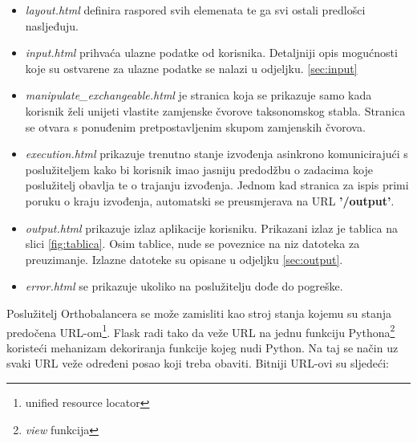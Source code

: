 \begin{itemize}

    \item \emph{layout.html} definira raspored svih elemenata te ga svi ostali
predlošci nasljeđuju.

    \item \emph{input.html} prihvaća ulazne podatke od korisnika. Detaljniji
opis mogućnosti koje su ostvarene za ulazne podatke se nalazi u odjeljku.
\ref{sec:input}

    \item \emph{manipulate\_exchangeable.html} je stranica koja se prikazuje
samo kada korisnik želi unijeti vlastite zamjenske čvorove taksonomskog stabla.
Stranica se otvara s ponuđenim pretpostavljenim skupom zamjenskih čvorova.

    \item \emph{execution.html}  prikazuje trenutno stanje izvođenja asinkrono
komunicirajući s poslužiteljem kako bi korisnik imao jasniju predodžbu o
zadacima koje poslužitelj obavlja te o trajanju izvođenja. Jednom kad stranica
za ispis primi poruku o kraju izvođenja, automatski se preusmjerava na URL
\textbf{'/output'}.

    \item \emph{output.html} prikazuje izlaz aplikacije korisniku. Prikazani
izlaz je tablica na slici \ref{fig:tablica}. Osim tablice, nude se poveznice na
niz datoteka za preuzimanje. Izlazne datoteke su opisane u odjeljku
\ref{sec:output}.

    \item \emph{error.html} se prikazuje ukoliko na poslužitelju dođe do
pogreške.

\end{itemize}

Poslužitelj Orthobalancera se može zamisliti kao stroj stanja kojemu su stanja
predočena URL-om\footnote{unified resource locator}. Flask radi tako da veže
URL na jednu funkciju Pythona\footnote{\emph{view} funkcija} koristeći
mehanizam dekoriranja \cite{pep318} funkcije kojeg nudi Python. Na taj se način uz
svaki URL veže određeni posao koji treba obaviti. Bitniji URL-ovi su sljedeći:

